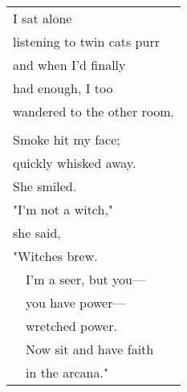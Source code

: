 \documentclass{article}
\begin{document}
\begin{center}
\begin{tabular}{l}
I sat alone \\
listening to twin cats purr \\
and when I'd finally \\
had enough, I too \\
wandered to the other room. \\
\\
Smoke hit my face; \\
quickly whisked away. \\
\hspace*{4ex}She smiled. \\
"I'm not a witch," \\
\hspace*{4ex}she said, \\
"Witches brew. \\
\ \ I'm a seer, but you--- \\
\ \ you have power--- \\
\ \ wretched power. \\
\ \ Now sit and have faith \\
\ \ in the arcana." \\
%
%
%
%
%
%
%
%
\end{tabular}
\end{center}
\end{document}
